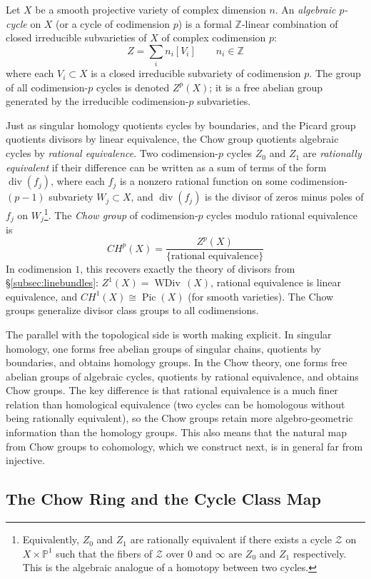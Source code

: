 \documentclass{article}
\newcommand{\Z}{{\mathbb{Z}}}
\newcommand{\CZ}{\mathcal{Z}}
\newcommand{\Pic}{\operatorname{Pic}}
\renewcommand{\div}{{\operatorname{div}}}
\newcommand{\WDiv}{{\operatorname{WDiv}\,}}
\begin{document}
Let $X$ be a smooth projective variety of complex dimension $n$. An
\emph{algebraic $p$-cycle} on $X$ (or a cycle of codimension $p$) is a formal
$\Z$-linear combination of closed irreducible subvarieties of $X$ of complex
codimension $p$:
\[
  Z = \sum_i n_i [V_i] \qquad n_i \in \Z
\]
where each $V_i \subset X$ is a closed irreducible subvariety of codimension
$p$. The group of all codimension-$p$ cycles is denoted $Z^p(X)$; it is a free
abelian group generated by the irreducible codimension-$p$ subvarieties.

Just as singular homology quotients cycles by boundaries, and the Picard group
quotients divisors by linear equivalence, the Chow group quotients algebraic
cycles by \emph{rational equivalence}. Two codimension-$p$ cycles $Z_0$ and
$Z_1$ are \emph{rationally equivalent} if their difference can be written as a
sum of terms of the form $\div(f_j)$, where each $f_j$ is a nonzero rational
function on some codimension-$(p-1)$ subvariety $W_j \subset X$, and $\div(f_j)$
is the divisor of zeros minus poles of $f_j$ on
$W_j$\footnote{Equivalently, $Z_0$ and $Z_1$ are rationally equivalent if
  there exists a cycle $\CZ$ on $X \times \mathbb{P}^1$ such that the fibers of $\CZ$
over $0$ and $\infty$ are $Z_0$ and $Z_1$ respectively. This is the algebraic
analogue of a homotopy between two cycles.}. The \emph{Chow group} of
codimension-$p$ cycles modulo rational equivalence is
\[
  CH^p(X) = \frac{Z^p(X)}{\{\text{rational equivalence}\}}
\]
In codimension $1$, this recovers exactly the theory of divisors from
\S\ref{subsec:linebundles}: $Z^1(X) = \WDiv(X)$, rational equivalence is
linear equivalence, and $CH^1(X) \cong \Pic(X)$ (for smooth varieties). The
Chow groups generalize divisor class groups to all codimensions.

The parallel with the topological side is worth making explicit. In singular
homology, one forms free abelian groups of singular chains, quotients by
boundaries, and obtains homology groups. In the Chow theory, one forms free
abelian groups of algebraic cycles, quotients by rational equivalence, and
obtains Chow groups. The key difference is that rational equivalence is a much
finer relation than homological equivalence (two cycles can be homologous
without being rationally equivalent), so the Chow groups retain more
algebro-geometric information than the homology groups. This also means that the
natural map from Chow groups to cohomology, which we construct next, is in
general far from injective.


\subsection{The Chow Ring and the Cycle Class Map}\label{subsec:chowring}
\end{document}
